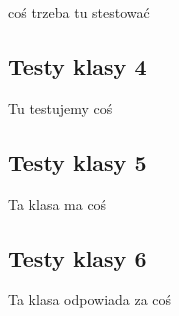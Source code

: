 \documentclass[a4paper,11pt]{article}
\newcommand\tab[1][0.6cm]{\hspace*{#1}}
\begin{document}
\tab coś trzeba tu stestować

\subsection{Testy klasy 4}

\tab Tu testujemy coś


\subsection{Testy klasy 5}

\tab Ta klasa ma coś

\subsection{Testy klasy 6}

\tab Ta klasa odpowiada za coś
\end{document}
